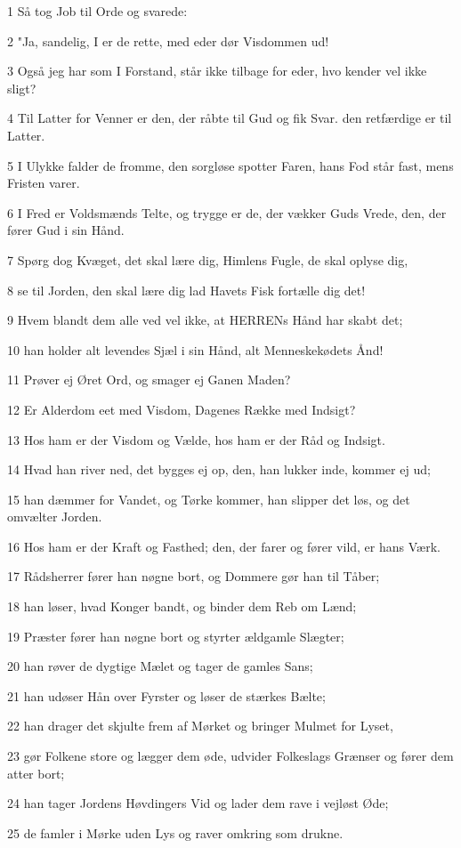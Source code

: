 \par 1 Så tog Job til Orde og svarede:
\par 2 "Ja, sandelig, I er de rette, med eder dør Visdommen ud!
\par 3 Også jeg har som I Forstand, står ikke tilbage for eder, hvo kender vel ikke sligt?
\par 4 Til Latter for Venner er den, der råbte til Gud og fik Svar. den retfærdige er til Latter.
\par 5 I Ulykke falder de fromme, den sorgløse spotter Faren, hans Fod står fast, mens Fristen varer.
\par 6 I Fred er Voldsmænds Telte, og trygge er de, der vækker Guds Vrede, den, der fører Gud i sin Hånd.
\par 7 Spørg dog Kvæget, det skal lære dig, Himlens Fugle, de skal oplyse dig,
\par 8 se til Jorden, den skal lære dig lad Havets Fisk fortælle dig det!
\par 9 Hvem blandt dem alle ved vel ikke, at HERRENs Hånd har skabt det;
\par 10 han holder alt levendes Sjæl i sin Hånd, alt Menneskekødets Ånd!
\par 11 Prøver ej Øret Ord, og smager ej Ganen Maden?
\par 12 Er Alderdom eet med Visdom, Dagenes Række med Indsigt?
\par 13 Hos ham er der Visdom og Vælde, hos ham er der Råd og Indsigt.
\par 14 Hvad han river ned, det bygges ej op, den, han lukker inde, kommer ej ud;
\par 15 han dæmmer for Vandet, og Tørke kommer, han slipper det løs, og det omvælter Jorden.
\par 16 Hos ham er der Kraft og Fasthed; den, der farer og fører vild, er hans Værk.
\par 17 Rådsherrer fører han nøgne bort, og Dommere gør han til Tåber;
\par 18 han løser, hvad Konger bandt, og binder dem Reb om Lænd;
\par 19 Præster fører han nøgne bort og styrter ældgamle Slægter;
\par 20 han røver de dygtige Mælet og tager de gamles Sans;
\par 21 han udøser Hån over Fyrster og løser de stærkes Bælte;
\par 22 han drager det skjulte frem af Mørket og bringer Mulmet for Lyset,
\par 23 gør Folkene store og lægger dem øde, udvider Folkeslags Grænser og fører dem atter bort;
\par 24 han tager Jordens Høvdingers Vid og lader dem rave i vejløst Øde;
\par 25 de famler i Mørke uden Lys og raver omkring som drukne.

